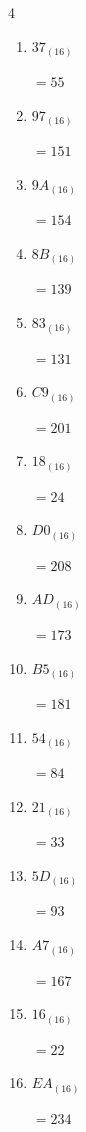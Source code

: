 \begin{multicols}{4}
\begin{enumerate}
        $=107$

  \item $37_{(16)}$

        $=55$

  \item $97_{(16)}$

        $=151$

  \item $9A_{(16)}$

        $=154$

  \item $8B_{(16)}$

        $=139$

  \item $83_{(16)}$

        $=131$

  \item $C9_{(16)}$

        $=201$

  \item $18_{(16)}$

        $=24$

  \item $D0_{(16)}$

        $=208$

  \item $AD_{(16)}$

        $=173$

  \item $B5_{(16)}$

        $=181$

  \item $54_{(16)}$

        $=84$

  \item $21_{(16)}$

        $=33$

  \item $5D_{(16)}$

        $=93$

\columnbreak %

  \item $A7_{(16)}$

        $=167$

  \item $16_{(16)}$

        $=22$

  \item $EA_{(16)}$

        $=234$


\end{enumerate}
\end{multicols}
